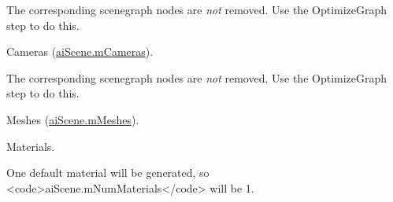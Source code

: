 \begin{Desc}
\begin{description}
The corresponding scenegraph nodes are {\itshape not} removed. Use the {\ttfamily Optimize\+Graph} step to do this. \item[{\em 
\hypertarget{namespaceassimp_1_1config_ad1b64b8f67159b86655b820ed6f75e62a799478edd1eac8cef184dd5b7bbd7f49}{C\+A\+M\+E\+R\+A\+S}\label{namespaceassimp_1_1config_ad1b64b8f67159b86655b820ed6f75e62a799478edd1eac8cef184dd5b7bbd7f49}
}]Cameras ({\ttfamily \hyperlink{structai_scene_a71e7d204d96969ca4f5a931f4d636f1e}{ai\+Scene.\+m\+Cameras}}).

The corresponding scenegraph nodes are {\itshape not} removed. Use the {\ttfamily Optimize\+Graph} step to do this. \item[{\em 
\hypertarget{namespaceassimp_1_1config_ad1b64b8f67159b86655b820ed6f75e62ac1294d5c150606d309710f98e4a7fead}{M\+E\+S\+H\+E\+S}\label{namespaceassimp_1_1config_ad1b64b8f67159b86655b820ed6f75e62ac1294d5c150606d309710f98e4a7fead}
}]Meshes ({\ttfamily \hyperlink{structai_scene_ad1c7000f0f28ea747868db9f94d32a3d}{ai\+Scene.\+m\+Meshes}}). \item[{\em 
\hypertarget{namespaceassimp_1_1config_ad1b64b8f67159b86655b820ed6f75e62af4a7d4d7f020b186ec599f2cb9d83413}{M\+A\+T\+E\+R\+I\+A\+L\+S}\label{namespaceassimp_1_1config_ad1b64b8f67159b86655b820ed6f75e62af4a7d4d7f020b186ec599f2cb9d83413}
}]Materials. \begin{DoxyVerb} One default material will be generated, so
 <code>aiScene.mNumMaterials</code> will be 1.\end{DoxyVerb}
 \end{description}
\end{Desc}



